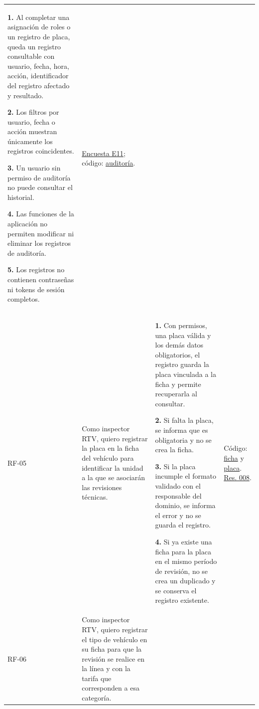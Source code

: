 \documentclass[11pt,a4paper]{article}
\begin{document}
\begin{xltabular}{\textwidth}{lL{4.2cm}XL{2cm}}
		\textbf{1.} Al completar una asignación de roles o un registro de placa, queda un registro consultable con usuario, fecha, hora, acción, identificador del registro afectado y resultado.\par
		\textbf{2.} Los filtros por usuario, fecha o acción muestran únicamente los registros coincidentes.\par
		\textbf{3.} Un usuario sin permiso de auditoría no puede consultar el historial.\par
		\textbf{4.} Las funciones de la aplicación no permiten modificar ni eliminar los registros de auditoría.\par
		\textbf{5.} Los registros no contienen contraseñas ni tokens de sesión completos. &
		\href{https://github.com/NixonPiguave/TA-PFC-E1-PFC-Entrega-1/blob/ccbbc93/evidencias/Encuesta\%20RTV\%20-\%20TA-PFC-E1.csv}{Encuesta E11}; código: \href{https://github.com/NixonPiguave/AppWebRevisionVehicular/blob/77d1ff6c38488fc02ab431472621ff4edb59f576/backend/src/main/java/com/revisionvehicular/backend/service/srtv/AuditoriaService.java}{auditoría}. \\
		RF-05 & Como inspector RTV, quiero registrar la placa en la ficha del vehículo para identificar la unidad a la que se asociarán las revisiones técnicas. &
		\textbf{1.} Con permisos, una placa válida y los demás datos obligatorios, el registro guarda la placa vinculada a la ficha y permite recuperarla al consultar.\par
		\textbf{2.} Si falta la placa, se informa que es obligatoria y no se crea la ficha.\par
		\textbf{3.} Si la placa incumple el formato validado con el responsable del dominio, se informa el error y no se guarda el registro.\par
		\textbf{4.} Si ya existe una ficha para la placa en el mismo período de revisión, no se crea un duplicado y se conserva el registro existente. &
		Código: \href{https://github.com/NixonPiguave/AppWebRevisionVehicular/blob/77d1ff6c38488fc02ab431472621ff4edb59f576/backend/src/main/java/com/revisionvehicular/backend/service/cv/VehiculoServiceImpl.java}{ficha} y \href{https://github.com/NixonPiguave/AppWebRevisionVehicular/blob/77d1ff6c38488fc02ab431472621ff4edb59f576/backend/src/main/java/com/revisionvehicular/backend/dtos/cv/VehiculoDTO.java}{placa}. \href{https://github.com/NixonPiguave/TA-PFC-E1-PFC-Entrega-1/blob/be245df8f15b1183f94bada0679adc18146016cd/docs/Anexos/RESOLUCION\%20008-DIR-2017-ANT.pdf\#page=53}{Res. 008}. \\
		RF-06 & Como inspector RTV, quiero registrar el tipo de vehículo en su ficha para que la revisión se realice en la línea y con la tarifa que corresponden a esa categoría. &

\end{xltabular}
\end{document}
